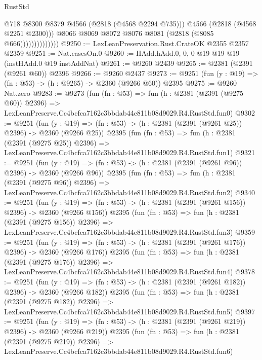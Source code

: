 \begin{lexlean}{RustStd}
\begin{coremodule}
                                @718
                                @8300
                                @8379
                                @4566
                                (@2818 (@4568 @2294 @735)))
                              @4566
                              (@2818 (@4568 @2251 @2300)))
                            @8066
                            @8069
                            @8072
                            @8076
                            @8081
                            (@2818 (@8085 @666))))))))))))))
@9250 := LexLeanPreservation.Rust.CrateOK @2355 @2357 @2359
@9251 := Nat.casesOn.{0}
@9260 := HAdd.hAdd.{0, 0, 0} @19 @19 @19 (instHAdd.{0} @19 instAddNat)
@9261 := @9260 @2439
@9265 := @2381 (@2391 (@9261 @60)) @2396
@9266 := @9260 @2437
@9273 := @9251 (fun (y : @19) => (fn : @53) -> (h : @9265) -> @2360 (@9266 @60)) @2395
@9275 := @9260 Nat.zero
@9283 := @9273
    (fun (fn : @53) =>
    fun (h : @2381 (@2391 (@9275 @60)) @2396) =>
    LexLeanPreserve.Cc4bcfca7162c3bbdab44e811b08d9029.R4.RustStd.fun0)
@9302 := @9251
    (fun (y : @19) => (fn : @53) -> (h : @2381 (@2391 (@9261 @25)) @2396) -> @2360 (@9266 @25))
    @2395
    (fun (fn : @53) =>
    fun (h : @2381 (@2391 (@9275 @25)) @2396) =>
    LexLeanPreserve.Cc4bcfca7162c3bbdab44e811b08d9029.R4.RustStd.fun1)
@9321 := @9251
    (fun (y : @19) => (fn : @53) -> (h : @2381 (@2391 (@9261 @96)) @2396) -> @2360 (@9266 @96))
    @2395
    (fun (fn : @53) =>
    fun (h : @2381 (@2391 (@9275 @96)) @2396) =>
    LexLeanPreserve.Cc4bcfca7162c3bbdab44e811b08d9029.R4.RustStd.fun2)
@9340 := @9251
    (fun (y : @19) => (fn : @53) -> (h : @2381 (@2391 (@9261 @156)) @2396) -> @2360 (@9266 @156))
    @2395
    (fun (fn : @53) =>
    fun (h : @2381 (@2391 (@9275 @156)) @2396) =>
    LexLeanPreserve.Cc4bcfca7162c3bbdab44e811b08d9029.R4.RustStd.fun3)
@9359 := @9251
    (fun (y : @19) => (fn : @53) -> (h : @2381 (@2391 (@9261 @176)) @2396) -> @2360 (@9266 @176))
    @2395
    (fun (fn : @53) =>
    fun (h : @2381 (@2391 (@9275 @176)) @2396) =>
    LexLeanPreserve.Cc4bcfca7162c3bbdab44e811b08d9029.R4.RustStd.fun4)
@9378 := @9251
    (fun (y : @19) => (fn : @53) -> (h : @2381 (@2391 (@9261 @182)) @2396) -> @2360 (@9266 @182))
    @2395
    (fun (fn : @53) =>
    fun (h : @2381 (@2391 (@9275 @182)) @2396) =>
    LexLeanPreserve.Cc4bcfca7162c3bbdab44e811b08d9029.R4.RustStd.fun5)
@9397 := @9251
    (fun (y : @19) => (fn : @53) -> (h : @2381 (@2391 (@9261 @219)) @2396) -> @2360 (@9266 @219))
    @2395
    (fun (fn : @53) =>
    fun (h : @2381 (@2391 (@9275 @219)) @2396) =>
    LexLeanPreserve.Cc4bcfca7162c3bbdab44e811b08d9029.R4.RustStd.fun6)

\end{coremodule}
\end{lexlean}
